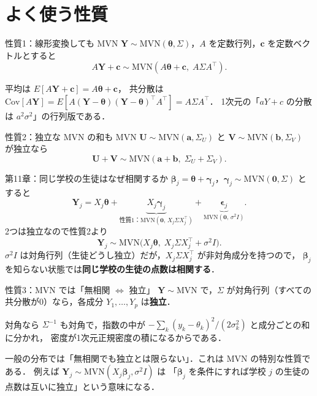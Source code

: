 \documentclass[lualatex,ja=standard,a4paper,12pt]{bxjsarticle}
\newcommand{\mvn}{\mathrm{MVN}}
\begin{document}
\section{よく使う性質}

\begin{thmbox}{性質1：線形変換しても MVN}
$\bm{Y} \sim \mvn(\bm{\theta}, \Sigma)$，$A$ を定数行列，$\bm{c}$ を定数ベクトルとすると
\[
  A\bm{Y} + \bm{c} \sim \mvn(A\bm{\theta} + \bm{c},\; A\Sigma A^\top).
\]
\end{thmbox}

\noindent 平均は $E[A\bm{Y} + \bm{c}] = A\bm{\theta} + \bm{c}$，
共分散は $\mathrm{Cov}[A\bm{Y}] = E[A(\bm{Y}-\bm{\theta})(\bm{Y}-\bm{\theta})^\top A^\top] = A\Sigma A^\top$．
1次元の「$aY + c$ の分散は $a^2\sigma^2$」の行列版である．

\begin{thmbox}{性質2：独立な MVN の和も MVN}
$\bm{U} \sim \mvn(\bm{a}, \Sigma_U)$ と $\bm{V} \sim \mvn(\bm{b}, \Sigma_V)$ が独立なら
\[
  \bm{U} + \bm{V} \sim \mvn(\bm{a} + \bm{b},\; \Sigma_U + \Sigma_V).
\]
\end{thmbox}

\begin{exbox}{第11章：同じ学校の生徒はなぜ相関するか}
$\bm{\beta}_j = \bm{\theta} + \bm{\gamma}_j$，$\bm{\gamma}_j \sim \mvn(\bm{0}, \Sigma)$ とすると
\[
  \bm{Y}_j = X_j\bm{\theta} + \underbrace{X_j\bm{\gamma}_j}_{\text{性質1：}\mvn(\bm{0},\, X_j\Sigma X_j^\top)}
  + \underbrace{\bm{\epsilon}_j}_{\mvn(\bm{0},\, \sigma^2 I)}.
\]
2つは独立なので性質2より
\[
  \bm{Y}_j \sim \mvn\bigl(X_j\bm{\theta},\; X_j\Sigma X_j^\top + \sigma^2 I\bigr).
\]
$\sigma^2 I$ は対角行列（生徒どうし独立）だが，$X_j\Sigma X_j^\top$ が非対角成分を持つので，
$\bm{\beta}_j$ を知らない状態では\textbf{同じ学校の生徒の点数は相関する}．
\end{exbox}

\begin{thmbox}{性質3：MVN では「無相関 $\Leftrightarrow$ 独立」}
$\bm{Y} \sim \mvn$ で，$\Sigma$ が対角行列（すべての共分散が0）なら，各成分 $Y_1, \ldots, Y_p$ は\textbf{独立}．
\end{thmbox}

\noindent 対角なら $\Sigma^{-1}$ も対角で，指数の中が $-\sum_k (y_k - \theta_k)^2/(2\sigma_k^2)$ と成分ごとの和に分かれ，
密度が1次元正規密度の積になるからである．

\begin{warningbox}
一般の分布では「無相関でも独立とは限らない」．これは MVN の特別な性質である．
例えば $\bm{Y}_j \sim \mvn(X_j\bm{\beta}_j, \sigma^2 I)$ は
「$\bm{\beta}_j$ を条件にすれば学校 $j$ の生徒の点数は互いに独立」という意味になる．
\end{warningbox}
\end{document}
